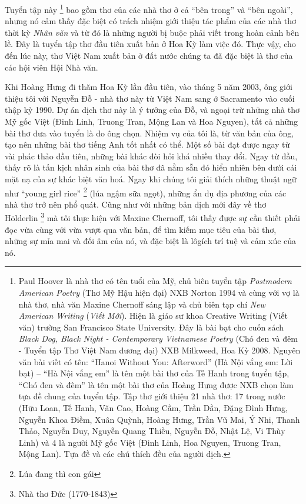 \documentclass[../main.tex]{subfiles}
\begin{document}
\begin{multicols}{2}
Tuyển tập này \footnote{
Paul Hoover là nhà thơ có tên tuổi của Mỹ, chủ biên tuyển tập \textit{Postmodern American Poetry} (Thơ Mỹ Hậu hiện đại) NXB Norton 1994 và cùng với vợ là nhà thơ, nhà văn Maxine Chernoff sáng lập và chủ biên tạp chí \textit{New American Writing} (\textit{Viết Mới}). Hiện là giáo sư khoa Creative Writing (Viết văn) trường San Francisco State University. Đây là bài bạt cho cuốn sách \textit{Black Dog, Black Night - Contemporary Vietnamese Poetry} (Chó đen và đêm - Tuyển tập Thơ Việt Nam đương đại) NXB Milkweed, Hoa Kỳ 2008. Nguyên văn bài viết có tên: “Hanoi Without You: Afterword” (Hà Nội vắng em: Lời bạt) – “Hà Nội vắng em” là tên một bài thơ của Tế Hanh trong tuyển tập, “Chó đen và đêm” là tên một bài thơ của Hoàng Hưng được NXB chọn làm tựa đề chung của tuyển tập. Tập thơ giới thiệu 21 nhà thơ: 17 trong nước (Hữu Loan, Tế Hanh, Văn Cao, Hoàng Cầm, Trần Dần, Đặng Đình Hưng, Nguyễn Khoa Điềm, Xuân Quỳnh, Hoàng Hưng, Trần Vũ Mai, Ý Nhi, Thanh Thảo, Nguyễn Duy, Nguyễn Quang Thiều, Nguyễn Đỗ, Nhật Lệ, Vi Thùy Linh) và 4 là người Mỹ gốc Việt (Đinh Linh, Hoa Nguyen, Truong Tran, Mộng Lan). Tựa đề và các chú thích đều của người dịch.}  bao gồm thơ của các nhà thơ ở cả “bên trong” và “bên ngoài”, nhưng nó cảm thấy đặc biệt có trách nhiệm giới thiệu tác phẩm của các nhà thơ thời kỳ \textit{Nhân văn} và từ đó là những người bị buộc phải viết trong hoàn cảnh bên lề. Đây là tuyển tập thơ đầu tiên xuất bản ở Hoa Kỳ làm việc đó. Thực vậy, cho đến lúc này, thơ Việt Nam xuất bản ở đất nước chúng ta đã đặc biệt là thơ của các hội viên Hội Nhà văn. 
 
Khi Hoàng Hưng đi thăm Hoa Kỳ lần đầu tiên, vào tháng 5 năm 2003, ông giới thiệu tôi với Nguyễn Đỗ - nhà thơ này từ Việt Nam sang ở Sacramento vào cuối thập kỷ 1990. Dự án dịch thơ này là ý tưởng của Đỗ, và ngoại trừ những nhà thơ Mỹ gốc Việt (Đinh Linh, Truong Tran, Mộng Lan và Hoa Nguyen), tất cả những bài thơ đưa vào tuyển là do ông chọn. Nhiệm vụ của tôi là, từ văn bản của ông, tạo nên những bài thơ tiếng Anh tốt nhất có thể. Một số bài đạt được ngay từ vài phác thảo đầu tiên, những bài khác đòi hỏi khá nhiều thay đổi. Ngay từ đầu, thấy rõ là tấn kịch nhân sinh của bài thơ đã nằm sẵn đó hiển nhiên bên dưới cái mặt nạ của sự khác biệt văn hoá. Ngay khi chúng tôi giải thích những thuật ngữ như “young girl rice” \footnote{
Lúa đang thì con gái}  (lúa ngậm sữa ngọt), những ẩn dụ địa phương của các nhà thơ trở nên phổ quát. Cũng như với những bản dịch mới đây về thơ Hölderlin \footnote{
Nhà thơ Đức (1770-1843)}  mà tôi thực hiện với Maxine Chernoff, tôi thấy được sự cần thiết phải đọc vừa cùng với vừa vượt qua văn bản, để tìm kiếm mục tiêu của bài thơ, những sự mỉa mai và đối âm của nó, và đặc biệt là lôgích trí tuệ và cảm xúc của nó. 
 

\end{multicols}
\end{document}
